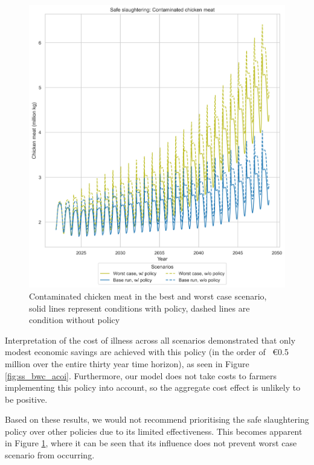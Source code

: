 \begin{figure}[h!]
\begin{minipage}{0.45\textwidth}
        \includegraphics[width=1\textwidth]{images/ss_Base and Worst Case_meat.png} 
        \caption{Contaminated chicken meat in the best and worst case scenario, solid lines represent conditions with policy, dashed lines are condition without policy}
        \label{fig:ss_bwc_meat}
    \end{minipage}
\end{figure}

Interpretation of the cost of illness across all scenarios demonstrated that only modest economic savings are achieved with this policy (in the order of ~€0.5 million over the entire thirty year time horizon), as seen in Figure \ref{fig:ss_bwc_acoi}. Furthermore, our model does not take costs to farmers implementing this policy into account, so the aggregate cost effect is unlikely to be positive.

Based on these results, we would not recommend prioritising the safe slaughtering policy over other policies due to its limited effectiveness. This becomes apparent in Figure \ref{fig:ss_bwc_meat}, where
it can be seen that its influence does not prevent worst case scenario from occurring. 

